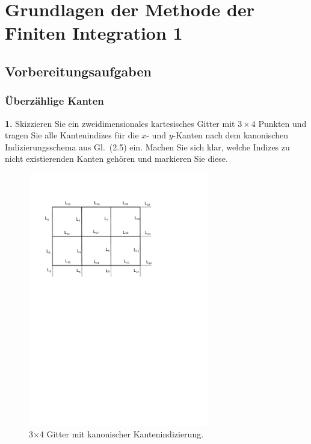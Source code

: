\documentclass[Protokollheft.tex]{subfiles}
\begin{document}
\chapter{Grundlagen der Methode der Finiten Integration 1}
\section{Vorbereitungsaufgaben}
    {\subsection{Überzählige Kanten}}

        \begin{framed}
	\noindent \textbf{1.} Skizzieren Sie ein zweidimensionales kartesisches Gitter mit
        $3\times 4$ Punkten und tragen Sie alle Kantenindizes für die $x$-
        und $y$-Kanten nach dem kanonischen Indizierungsschema aus Gl.~(2.5) ein. Machen Sie sich klar, welche Indizes zu
        nicht existierenden Kanten gehören und markieren Sie diese.\label{exer:edgeIndices}
\end{framed}
	\begin{figure}[h]
		\centering
		\includegraphics[trim = 10mm 170mm 65mm 20mm, clip, width=0.7\textwidth]{Zeichnung.pdf}
		\caption{3$\times$4 Gitter mit kanonischer Kantenindizierung.}
	\end{figure}
\end{document}
